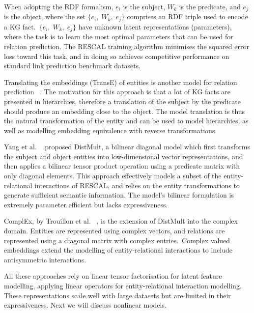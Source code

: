\noindent When adopting the RDF formalism, $ e_i $ is the subject, $ W_k $ is the predicate, and $ e_j $ is the object, where the set $ \{ e_i, \; W_k, \; e_j \} $ comprises an RDF triple used to encode a KG fact.\ $ \{ e_i, \; W_k, \; e_j \} $ have unknown latent representations (parameters), where the task is to learn the most optimal parameters that can be used for relation prediction. The RESCAL training algorithm minimises the squared error loss toward this task, and in doing so achieves competitive performance on standard link prediction benchmark datasets. \par

\noindent Translating the embeddings (TransE) of entities is another model for relation prediction \unskip~\citep{bordes2013translating}. The motivation for this approach is that a lot of KG facts are presented in hierarchies, therefore a translation of the subject by the predicate should produce an embedding close to the object. The model translation is thus the natural transformation of the entity and can be used to model hierarchies, as well as modelling embedding equivalence with reverse transformations. \par

\noindent Yang et al. \unskip~\citep{yang2014embedding} proposed DistMult, a bilinear diagonal model which first transforms the subject and object entities into low-dimensional vector representations, and then applies a bilinear tensor product operation using a predicate matrix with only diagonal elements. This approach effectively models a subset of the entity-relational interactions of RESCAL, and relies on the entity transformations to generate sufficient semantic information. The model's bilinear formulation is extremely parameter efficient but lacks expressiveness. \par

\noindent ComplEx, by Trouillon et al. \unskip~\citep{trouillon2016complex}, is the extension of DistMult into the complex domain. Entities are represented using complex vectors, and relations are represented using a diagonal matrix with complex entries.\ Complex valued embeddings extend the modelling of entity-relational interactions to include antisymmetric interactions. \par

\noindent All these approaches rely on linear tensor factorisation for latent feature modelling, applying linear operators for entity-relational interaction modelling. These representations scale well with large datasets but are limited in their expressiveness. Next we will discuss nonlinear models. \par

